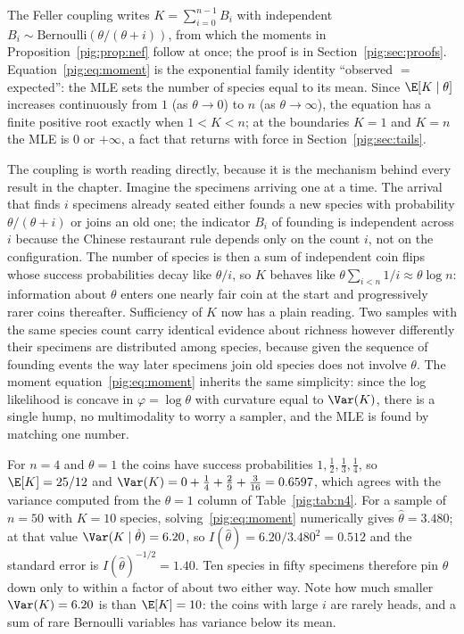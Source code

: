 The Feller coupling writes $K=\sum_{i=0}^{n-1}B_i$ with independent $B_i\sim\mathrm{Bernoulli}(\theta/(\theta+i))$, from which the moments in Proposition~\ref{pig:prop:nef} follow at once; the proof is in Section~\ref{pig:sec:proofs}. Equation~\eqref{pig:eq:moment} is the exponential family identity ``observed $=$ expected'': the MLE sets the number of species equal to its mean. Since $\E[K\mid\theta]$ increases continuously from $1$ (as $\theta\to0$) to $n$ (as $\theta\to\infty$), the equation has a finite positive root exactly when $1<K<n$; at the boundaries $K=1$ and $K=n$ the MLE is $0$ or $+\infty$, a fact that returns with force in Section~\ref{pig:sec:tails}.

The coupling is worth reading directly, because it is the mechanism behind every result in the chapter. Imagine the specimens arriving one at a time. The arrival that finds $i$ specimens already seated either founds a new species with probability $\theta/(\theta+i)$ or joins an old one; the indicator $B_i$ of founding is independent across $i$ because the Chinese restaurant rule depends only on the count $i$, not on the configuration. The number of species is then a sum of independent coin flips whose success probabilities decay like $\theta/i$, so $K$ behaves like $\theta\sum_{i<n}1/i\approx\theta\log n$: information about $\theta$ enters one nearly fair coin at the start and progressively rarer coins thereafter. Sufficiency of $K$ now has a plain reading. Two samples with the same species count carry identical evidence about richness however differently their specimens are distributed among species, because given the sequence of founding events the way later specimens join old species does not involve $\theta$. The moment equation~\eqref{pig:eq:moment} inherits the same simplicity: since the log likelihood is concave in $\varphi=\log\theta$ with curvature equal to $\Var(K)$, there is a single hump, no multimodality to worry a sampler, and the MLE is found by matching one number.

\begin{example}\label{pig:ex:feller}
For $n=4$ and $\theta=1$ the coins have success probabilities $1,\tfrac12,\tfrac13,\tfrac14$, so $\E[K]=25/12$ and $\Var(K)=0+\tfrac14+\tfrac29+\tfrac{3}{16}=0.6597$, which agrees with the variance computed from the $\theta=1$ column of Table~\ref{pig:tab:n4}. For a sample of $n=50$ with $K=10$ species, solving~\eqref{pig:eq:moment} numerically gives $\hat\theta=3.480$; at that value $\Var(K\mid\hat\theta)=6.20$, so $I(\hat\theta)=6.20/3.480^2=0.512$ and the standard error is $I(\hat\theta)^{-1/2}=1.40$. Ten species in fifty specimens therefore pin $\theta$ down only to within a factor of about two either way. Note how much smaller $\Var(K)=6.20$ is than $\E[K]=10$: the coins with large $i$ are rarely heads, and a sum of rare Bernoulli variables has variance below its mean.
\end{example}

